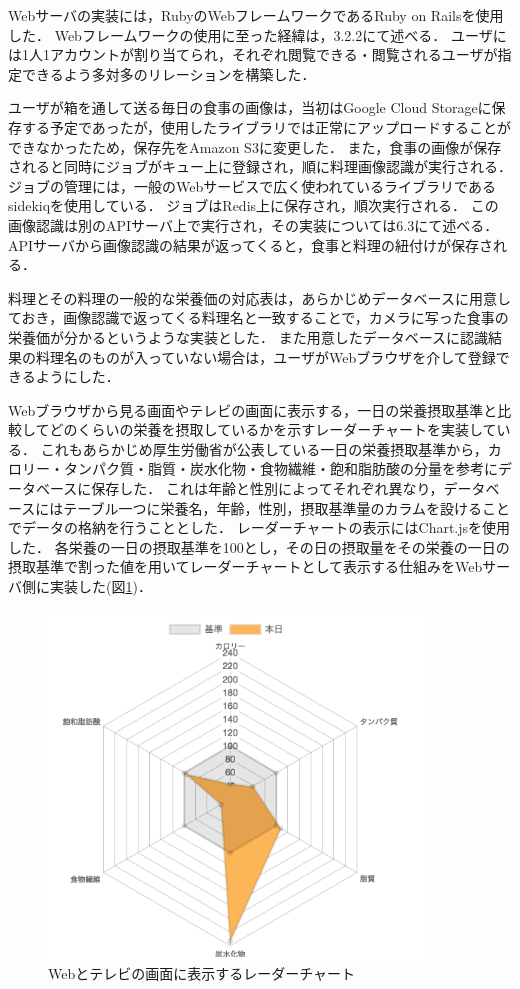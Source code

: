 \documentclass[../report]{subfiles}
\begin{document}
Webサーバの実装には，RubyのWebフレームワークであるRuby on Railsを使用した．
Webフレームワークの使用に至った経緯は，3.2.2にて述べる．
ユーザには1人1アカウントが割り当てられ，それぞれ閲覧できる・閲覧されるユーザが指定できるよう多対多のリレーションを構築した．

ユーザが箱を通して送る毎日の食事の画像は，当初はGoogle Cloud Storageに保存する予定であったが，使用したライブラリでは正常にアップロードすることができなかったため，保存先をAmazon S3に変更した．
また，食事の画像が保存されると同時にジョブがキュー上に登録され，順に料理画像認識が実行される．
ジョブの管理には，一般のWebサービスで広く使われているライブラリであるsidekiqを使用している．
ジョブはRedis上に保存され，順次実行される．
この画像認識は別のAPIサーバ上で実行され，その実装については6.3にて述べる．
APIサーバから画像認識の結果が返ってくると，食事と料理の紐付けが保存される．

料理とその料理の一般的な栄養価の対応表は，あらかじめデータベースに用意しておき，画像認識で返ってくる料理名と一致することで，カメラに写った食事の栄養価が分かるというような実装とした．
また用意したデータベースに認識結果の料理名のものが入っていない場合は，ユーザがWebブラウザを介して登録できるようにした．

Webブラウザから見る画面やテレビの画面に表示する，一日の栄養摂取基準と比較してどのくらいの栄養を摂取しているかを示すレーダーチャートを実装している．
これもあらかじめ厚生労働省が公表している一日の栄養摂取基準から，カロリー・タンパク質・脂質・炭水化物・食物繊維・飽和脂肪酸の分量を参考にデータベースに保存した．
これは年齢と性別によってそれぞれ異なり，データベースにはテーブル一つに栄養名，年齢，性別，摂取基準量のカラムを設けることでデータの格納を行うこととした．
レーダーチャートの表示にはChart.jsを使用した．
各栄養の一日の摂取基準を100とし，その日の摂取量をその栄養の一日の摂取基準で割った値を用いてレーダーチャートとして表示する仕組みをWebサーバ側に実装した(図\ref{fig:6-radarchart})．

\begin{figure}[htbp]
    \begin{center}
        \includegraphics[width=10cm]{imgs/6_radar.png}
        \caption{Webとテレビの画面に表示するレーダーチャート}
        \label{fig:6-radarchart}
    \end{center}
\end{figure}
\end{document}
